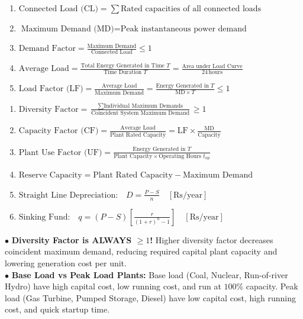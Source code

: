 \documentclass[10pt,a4paper]{article}
\begin{document}
\begin{tcolorbox}[formulabox, title=Master Formulas for Load Curves \& Plant Economics]
\small
\begin{minipage}[t]{0.48\textwidth}
\begin{enumerate}
  \item $\text{Connected Load (CL)} = \sum \text{Rated capacities of all connected loads}$
  \item $\text{Maximum Demand (MD)} = \text{Peak instantaneous power demand}$
  \item $\text{Demand Factor} = \frac{\text{Maximum Demand}}{\text{Connected Load}} \le 1$
  \item $\text{Average Load} = \frac{\text{Total Energy Generated in Time } T}{\text{Time Duration } T} = \frac{\text{Area under Load Curve}}{24\,\text{hours}}$
  \item $\text{Load Factor (LF)} = \frac{\text{Average Load}}{\text{Maximum Demand}} = \frac{\text{Energy Generated in } T}{\text{MD} \times T} \le 1$
\end{enumerate}
\end{minipage}\hfill
\begin{minipage}[t]{0.48\textwidth}
\begin{enumerate}[resume]
  \item $\text{Diversity Factor} = \frac{\sum \text{Individual Maximum Demands}}{\text{Coincident System Maximum Demand}} \ge 1$
  \item $\text{Capacity Factor (CF)} = \frac{\text{Average Load}}{\text{Plant Rated Capacity}} = \text{LF} \times \frac{\text{MD}}{\text{Capacity}}$
  \item $\text{Plant Use Factor (UF)} = \frac{\text{Energy Generated in } T}{\text{Plant Capacity} \times \text{Operating Hours } t_{\text{op}}}$
  \item $\text{Reserve Capacity} = \text{Plant Rated Capacity} - \text{Maximum Demand}$
  \item $\text{Straight Line Depreciation:} \quad D = \frac{P - S}{n} \quad [\text{Rs/year}]$
  \item $\text{Sinking Fund:} \quad q = (P - S) \left[ \frac{r}{(1+r)^n - 1} \right] \quad [\text{Rs/year}]$
\end{enumerate}
\end{minipage}
\end{tcolorbox}

\begin{tcolorbox}[trapbox, title=Key Exam Traps \& Quick Facts for Module 1]
\footnotesize
$\bullet$ \textbf{Diversity Factor is ALWAYS $\ge 1$!} Higher diversity factor decreases coincident maximum demand, reducing required capital plant capacity and lowering generation cost per unit.\\
$\bullet$ \textbf{Base Load vs Peak Load Plants:} Base load (Coal, Nuclear, Run-of-river Hydro) have high capital cost, low running cost, and run at $100\%$ capacity. Peak load (Gas Turbine, Pumped Storage, Diesel) have low capital cost, high running cost, and quick startup time.
\end{tcolorbox}
\end{document}
